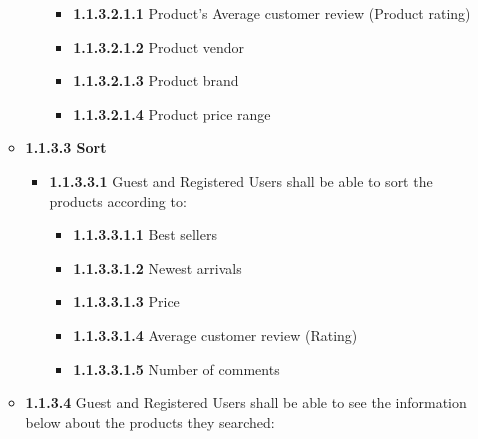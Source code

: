 \documentclass[]{article}
\providecommand{\tightlist}{%
  \setlength{\itemsep}{0pt}\setlength{\parskip}{0pt}}
\begin{document}
\begin{itemize}
\begin{itemize}
\begin{itemize}
                              \begin{itemize}
                                  \tightlist
                                  \item
                                        \textbf{1.1.3.2.1.1} Product's Average customer review (Product
                                        rating)
                                  \item
                                        \textbf{1.1.3.2.1.2} Product vendor
                                  \item
                                        \textbf{1.1.3.2.1.3} Product brand
                                  \item
                                        \textbf{1.1.3.2.1.4} Product price range
                              \end{itemize}
                    \end{itemize}
              \item
                    \textbf{1.1.3.3 Sort}

                    \begin{itemize}
                        \item
                              \textbf{1.1.3.3.1} Guest and Registered Users shall be able to
                              sort the products according to:

                              \begin{itemize}
                                  \tightlist
                                  \item
                                        \textbf{1.1.3.3.1.1} Best sellers
                                  \item
                                        \textbf{1.1.3.3.1.2} Newest arrivals
                                  \item
                                        \textbf{1.1.3.3.1.3} Price
                                  \item
                                        \textbf{1.1.3.3.1.4} Average customer review (Rating)
                                  \item
                                        \textbf{1.1.3.3.1.5} Number of comments
                              \end{itemize}
                    \end{itemize}
              \item
                    \textbf{1.1.3.4} Guest and Registered Users shall be able to see the
                    information below about the products they searched:


\end{itemize}
\end{itemize}
\end{document}
